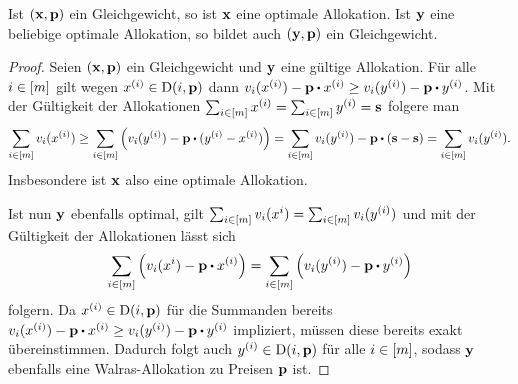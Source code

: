 \begin{lemma}
	Ist $(\mathbf{x}, \mathbf{p})$ ein Gleichgewicht, so ist $\mathbf{x}$ eine optimale Allokation.
	Ist $\mathbf{y}$ eine beliebige optimale Allokation, so bildet auch $(\mathbf{y}, \mathbf{p})$ ein Gleichgewicht.
\end{lemma}
\begin{proof}
	Seien $(\mathbf{x}, \mathbf{p})$ ein Gleichgewicht und $\mathbf{y}$ eine gültige Allokation.
	Für alle $i\in\left[ m \right]$ gilt wegen $x^{(i)} \in \operatorname{D}(i,\mathbf{p})$ dann $v_i(x^{(i)}) - \fp \bcdot x^{(i)} \geq v_i(y^{(i)}) - \fp \bcdot y^{(i)}$.
	Mit der Gültigkeit der Allokationen $\sum_{i\in\left[ m \right]} x^{(i)} = \sum_{i\in\left[ m \right]} y^{(i)} = \mathbf{s}$ folgere man
	\[
		\sum_{i\in\first{m}} v_i(x^{(i)}) \geq
		\sum_{i\in\first{m}} \left( v_i(y^{(i)}) - \fp \bcdot (y^{(i)} - x^{(i)}) \right)
		= \sum_{i\in\first{m}} v_i(y^{(i)}) - \fp \bcdot (\fs - \fs) = \sum_{i\in\first{m}} v_i(y^{(i)}).
	\]
	Insbesondere ist $\mathbf{x}$ also eine optimale Allokation.
	
	Ist nun $\mathbf{y}$ ebenfalls optimal, gilt 
	$ \sum_{i\in\left[ m \right]} v_i(x^{i}) = \sum_{i\in\left[ m \right]} v_i(y^{(i)}) $ und mit der Gültigkeit der Allokationen lässt sich
	\[
		\sum_{i\in\first{m}} \left( v_i(x^{i}) - \fp \bcdot x^{(i)} \right)
		= \sum_{i\in\first{m}} \left( v_i(y^{(i)}) - \fp \bcdot y^{(i)} \right)
	\]
	folgern.
	Da $x^{(i)}\in\operatorname{D}(i, \mathbf{p})$ für die Summanden bereits $v_i(x^{(i)}) - \fp \bcdot  x^{(i)} \geq v_i(y^{(i)}) - \fp \bcdot y^{(i)}$ impliziert, müssen diese bereits exakt übereinstimmen.
	Dadurch folgt auch $y^{(i)}\in\operatorname{D}(i, \mathbf{p})$ für alle $i\in\left[ m \right]$, sodass $\mathbf{y}$ ebenfalls eine Walras-Allokation zu Preisen $\mathbf{p}$ ist.
\end{proof}


